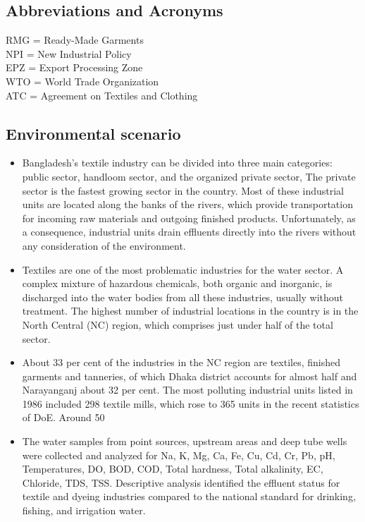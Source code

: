 \documentclass[conference]{IEEEtran}
\begin{document}
\subsection{Abbreviations and Acronyms}\label{AA}
RMG = Ready-Made Garments\\
NPI = New Industrial Policy\\
EPZ = Export Processing Zone \\
WTO = World Trade Organization\\
ATC = Agreement on Textiles and Clothing\\


\subsection{ Environmental scenario}
\begin{itemize}
\item Bangladesh’s textile industry can be divided into three main categories: public sector, handloom sector, and the organized private sector, The private sector is the fastest growing sector in the country. Most of these industrial units are located along the banks of the rivers, which provide transportation for incoming raw materials and outgoing finished products. Unfortunately, as a consequence, industrial units drain effluents directly into the rivers without any consideration of the environment.
\item Textiles are one of the most problematic industries for the water sector. A complex mixture of hazardous chemicals, both organic and inorganic, is discharged into the water bodies from all these industries, usually without treatment. The highest number of industrial locations in the country is in the North Central (NC) region, which comprises just under half of the total sector.
\item About 33 per cent of the industries in the NC region are textiles, finished garments and tanneries, of which Dhaka district accounts for almost half and Narayanganj about 32 per cent. The most polluting industrial units listed in 1986 included 298 textile mills, which rose to 365 units in the recent statistics of DoE. Around 50%
\item The water samples from point sources, upstream areas and deep tube wells were collected and analyzed for Na, K, Mg, Ca, Fe, Cu, Cd, Cr, Pb, pH, Temperatures, DO, BOD, COD, Total hardness, Total alkalinity, EC, Chloride, TDS, TSS. Descriptive analysis identified the effluent status for textile and dyeing industries compared to the national standard for drinking, fishing, and irrigation water. 
\end{itemize}
\end{document}
